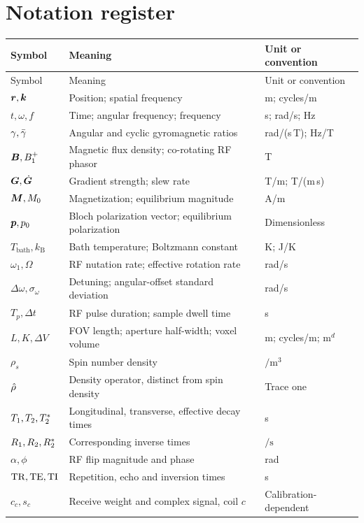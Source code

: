 \section*{Notation register}
\renewcommand{\arraystretch}{1.15}
\begin{longtable}{@{}p{}p{}p{}@{}}
\toprule Symbol & Meaning & Unit or convention\\ \midrule
\endfirsthead
\toprule Symbol & Meaning & Unit or convention\\ \midrule
\endhead
$\bm{r},\bm{k}$ & Position; spatial frequency & m; cycles/m\\
$t,\omega,f$ & Time; angular frequency; frequency & s; rad/s; Hz\\
$\gamma,\bar{\gamma}$ & Angular and cyclic gyromagnetic ratios & rad/(s\,T); Hz/T\\
$\bm{B},B_{1}^{+}$ & Magnetic flux density; co-rotating RF phasor & T\\
$\bm{G},\dot{\bm{G}}$ & Gradient strength; slew rate & T/m; T/(m\,s)\\
$\bm{M},M_0$ & Magnetization; equilibrium magnitude & A/m\\
$\bm{p},p_0$ & Bloch polarization vector; equilibrium polarization & Dimensionless\\
$T_{\mathrm{bath}},k_{\mathrm B}$ & Bath temperature; Boltzmann constant & K; J/K\\
$\omega_1,\Omega$ & RF nutation rate; effective rotation rate & rad/s\\
$\Delta\omega,\sigma_\omega$ & Detuning; angular-offset standard deviation & rad/s\\
$T_p,\Delta t$ & RF pulse duration; sample dwell time & s\\
$L,K,\Delta V$ & FOV length; aperture half-width; voxel volume & m; cycles/m; $\mathrm m^d$\\
$\rho_s$ & Spin number density & $\si{\per\cubic\metre}$\\
$\hat{\rho}$ & Density operator, distinct from spin density & Trace one\\
$T_1,T_2,T_{2}^{*}$ & Longitudinal, transverse, effective decay times & s\\
$R_1,R_2,R_{2}^{*}$ & Corresponding inverse times & $\si{\per\second}$\\
$\alpha,\phi$ & RF flip magnitude and phase & rad\\
$\mathrm{TR},\mathrm{TE},\mathrm{TI}$ & Repetition, echo and inversion times & s\\
$c_c,s_c$ & Receive weight and complex signal, coil $c$ & Calibration-dependent\\

\end{longtable}

